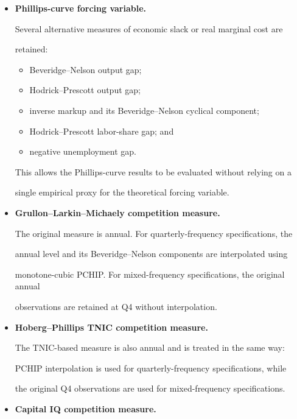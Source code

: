 \documentclass[11pt]{article}
\begin{document}
\begin{itemize}
\begin{itemize}
    \end{itemize}

    \item \textbf{Phillips-curve forcing variable.}

    Several alternative measures of economic slack or real marginal cost are

    retained:

    \begin{itemize}

        \item Beveridge--Nelson output gap;

        \item Hodrick--Prescott output gap;

        \item inverse markup and its Beveridge--Nelson cyclical component;

        \item Hodrick--Prescott labor-share gap; and

        \item negative unemployment gap.

    \end{itemize}

    This allows the Phillips-curve results to be evaluated without relying on a

    single empirical proxy for the theoretical forcing variable.

    \item \textbf{Grullon--Larkin--Michaely competition measure.}

    The original measure is annual. For quarterly-frequency specifications, the

    annual level and its Beveridge--Nelson components are interpolated using

    monotone-cubic PCHIP. For mixed-frequency specifications, the original annual

    observations are retained at Q4 without interpolation.

    \item \textbf{Hoberg--Phillips TNIC competition measure.}

    The TNIC-based measure is also annual and is treated in the same way:

    PCHIP interpolation is used for quarterly-frequency specifications, while

    the original Q4 observations are used for mixed-frequency specifications.

    \item \textbf{Capital IQ competition measure.}


\end{itemize}
\end{document}
